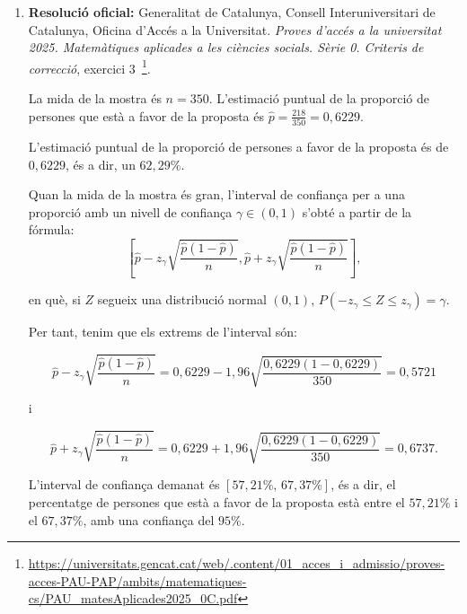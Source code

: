 \begin{enumerate}
\begin{enumerate}[a)]
  Marge: $1{,}96\cdot\frac{3}{\sqrt{10}}\approx1{,}86$.

  Interval: $(148-1{,}86;\ 148+1{,}86)=(146{,}14;\ 149{,}86)$ grams.
  \item Amb un nivell de confiança del $95\%$, es pot afirmar que la informació de l'etiqueta és errònia, ja que els $150$ grams queden fora de l'interval de confiança. Per tant, les dades indiquen que la mitjana real de contingut dels iogurts és inferior a $150$ grams.
 \end{enumerate}

 \item \textbf{Resolució oficial:} Generalitat de Catalunya, Consell Interuniversitari de Catalunya, Oficina d'Accés a la Universitat. \textit{Proves d'accés a la universitat 2025. Matemàtiques aplicades a les ciències socials. Sèrie 0. Criteris de correcció}, exercici 3~\footnote{\url{https://universitats.gencat.cat/web/.content/01_acces_i_admissio/proves-acces-PAU-PAP/ambits/matematiques-cs/PAU_matesAplicades2025_0C.pdf}}.

 La mida de la mostra és $n=350$. L'estimació puntual de la proporció de persones que està a favor de la proposta és $\hat{p}=\frac{218}{350}=0{,}6229$.

 L'estimació puntual de la proporció de persones a favor de la proposta és de $0{,}6229$, és a dir, un $62{,}29\%$.

 Quan la mida de la mostra és gran, l'interval de confiança per a una proporció amb un nivell de confiança $\gamma\in(0,1)$ s'obté a partir de la fórmula:
 $$\left[\hat{p}-z_{\gamma}\sqrt{\frac{\hat{p}(1-\hat{p})}{n}}, \hat{p}+z_{\gamma}\sqrt{\frac{\hat{p}(1-\hat{p})}{n}} \right],$$

 en què, si $Z$ segueix una distribució normal $(0,1)$, $P(-z_{\gamma}\leq Z\leq z_{\gamma})=\gamma$.

 Per tant, tenim que els extrems de l'interval són:

 $$\hat{p}-z_{\gamma}\sqrt{\frac{\hat{p}(1-\hat{p})}{n}}=0{,}6229-1{,}96\sqrt{\frac{0{,}6229(1-0{,}6229)}{350}}=0{,}5721$$

 i

 $$\hat{p}+z_{\gamma}\sqrt{\frac{\hat{p}(1-\hat{p})}{n}}=0{,}6229+1{,}96\sqrt{\frac{0{,}6229(1-0{,}6229)}{350}}=0{,}6737.$$

L'interval de confiança demanat és $[57{,}21\%,\,67{,}37\%]$, és a dir, el percentatge de persones que està a favor de la proposta està entre el $57{,}21\%$ i el $67{,}37\%$, amb una confiança del $95\%$.
\end{enumerate}

